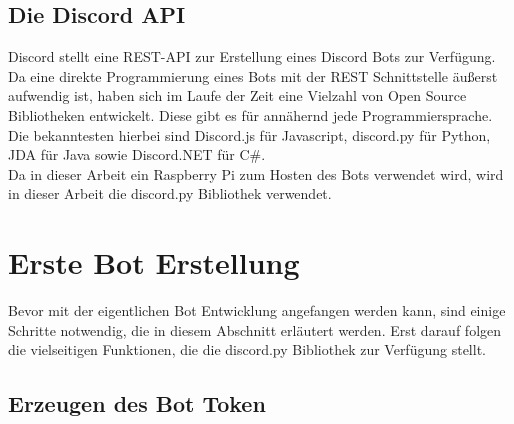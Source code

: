 \documentclass[sigplan,screen]{acmart}
\begin{document}
\newpage


\subsection{Die Discord API}

Discord stellt eine REST-API zur Erstellung eines Discord Bots zur Verfügung. Da eine direkte Programmierung eines Bots mit der REST Schnittstelle äußerst aufwendig ist, haben sich im Laufe der Zeit eine Vielzahl von Open Source Bibliotheken entwickelt. Diese gibt es für annähernd jede Programmiersprache. Die bekanntesten  hierbei sind Discord.js für Javascript, discord.py für Python, JDA für Java sowie Discord.NET für C\#. \cite{didoc1} \\
\noindent Da in dieser Arbeit ein Raspberry Pi zum Hosten des Bots verwendet wird, wird in dieser Arbeit die discord.py Bibliothek verwendet. \cite{pcdoc1} 

\section{Erste Bot Erstellung}

Bevor mit der eigentlichen Bot Entwicklung angefangen werden kann, sind einige Schritte notwendig, die in diesem Abschnitt erläutert werden. Erst darauf folgen die vielseitigen Funktionen, die die discord.py Bibliothek zur Verfügung stellt. 

\subsection{Erzeugen des Bot Token}
\end{document}
